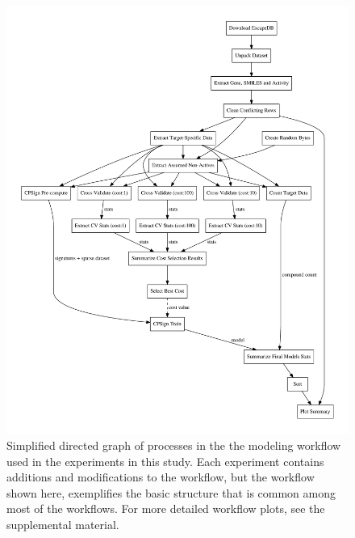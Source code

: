 \documentclass[utf8]{frontiersSCNS} %
\begin{document}
\begin{figure}[h!]
\vspace{2\baselineskip}
\includegraphics[width=\textwidth]{figures/workflow_graph_clean.pdf}
    \caption{Simplified directed graph of processes in the the modeling workflow used
    in the experiments in this study. Each experiment contains additions and modifications
    to the workflow, but the workflow shown here, exemplifies the basic structure
    that is common among most of the workflows. For more detailed workflow
    plots, see the supplemental material.}
    \label{fig:workflow_graph_clean}
\end{figure}
\end{document}
